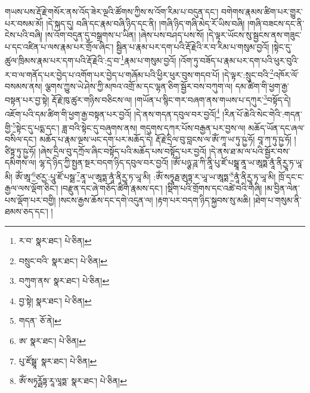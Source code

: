 གཡས་པས་རྡོ་རྗེ་གསོར་ནས་འོད་ཟེར་ལྔའི་ཚོགས་ཀྱིས་ས་འོག་རིམ་པ་བདུན་དང་། བགེགས་རྣམས་ཚིག་པར་གྱུར་པར་བསམ་མོ། །དེ་སྐད་དུ། བཞི་དང་རྣམ་བཞི་ཉིད་དང་ནི། །གཞི་ཉིད་གཞི་མེད་རོ་ཡིས་བཞི། །གཞི་བཟངས་དང་ནི་ངེས་པའི་བཞི། །ས་འོག་བདུན་དུ་བསྒྲགས་པ་ཡིན། །ཞེས་པས་བཤད་པས་སོ། །དེ་ལྟར་ཡོངས་སུ་སྦྱངས་ནས་གཟུང་པ་དང་འཛིན་པ་ལས་རྣམ་པར་གྲོལ་ཞིང་། སྦྱིན་པ་རྣམ་པར་དག་པའི་རྡོ་རྗེའི་ར་བ་རིམ་པ་གསུམ་བྱའོ། །སྟེང་དུ་ཚུལ་ཁྲིམས་རྣམ་པར་དག་པའི་རྡོ་རྗེའི་:དྲ་བ་\footnote{ར་བ་  སྣར་ཐང་།  པེ་ཅིན། }རྣམ་པ་གསུམ་བྱའོ། །འོག་ཏུ་བཟོད་པ་རྣམ་པར་དག་པའི་ཕུར་བུའི་ར་བ་ལ་གནོད་པར་བྱེད་པ་འགོག་པར་བྱེད་པ་གཞོམ་པའི་ཕྱིར་ཕུར་བུས་གདབ་པོ། །དེ་ལྟར་:སྲུང་བའི་\footnote{བསྲུང་བའི་  སྣར་ཐང་།  པེ་ཅིན། }འཁོར་ལོ་བསམས་ནས། ལྕགས་ཀྱུས་ཡེ་ཤེས་ཀྱི་མཁའ་འགྲོ་མ་དང་ལྷན་ཅིག་སྦྱོར་བས་བཀུག་ལ། དམ་ཚིག་གི་ཕྱག་རྒྱ་བསྟན་པར་བྱ་སྟེ། རྡོ་རྗེ་ཁུ་ཚུར་གཉིས་བཅིངས་ལ། །གཡོན་པ་སྙིང་གར་བཞག་ནས་གཡས་པ་དཀུར་\footnote{བཀུག་ནས་  སྣར་ཐང་།  པེ་ཅིན། }བསྟོད་དེ། འཇོག་པའི་དམ་ཚིག་གི་ཕྱག་རྒྱ་བསྟན་པར་བྱའོ། །དེ་ནས་གདན་དབུལ་བར་བྱའོ།\footnote{བྱ་སྟེ།  སྣར་ཐང་།  པེ་ཅིན། } །རིན་པོ་ཆེའི་སེང་གེའི་:གདན་གྱི་\footnote{གདན་  ཅོ་ནེ། }སྟེང་དུ་པདྨ་དང་། ཟླ་བའི་སྟེང་དུ་བཞུགས་ནས། གདུགས་དཀར་པོས་བརྒྱན་པར་བྱས་ལ། མཆོད་ཡོན་དང་ཞལ་བསིལ་དང་། མཆོད་པ་རྣམ་ལྔས་ཡང་དག་པར་མཆོད་དེ། རྡོ་རྗེ་དྲིལ་བུ་བླངས་ལ་ཨོཾ་ཀཱ་ཡ་ཏུ་ཥྱ་ཧོ། བཱ་ཀ་ཏུ་ཥྱ་ཧོ། །ཙིཏྟ་ཏུ་ཥྱ་ཧོ། །ཞེས་དྲིལ་བུ་དཀྲོལ་ཞིང་བསྟོད་པའི་མཆོད་པས་བསྟོད་པར་བྱའོ། །དེ་ནས་ཐ་མ་ལ་པའི་སྦྱོར་བས་དམིགས་ལ། ལྷ་དེ་ཉིད་ཀྱི་སྤྱན་སྔར་བདག་ཉིད་དབུལ་བར་བྱའོ། །ཨོཾ་པཉྩ་ཌཱ་ཀི་ནཱི་པུ་ཛོ་པསྠཱ་ནཱ་ཡ་ཨཱཏྨ་ནཱཾ་ནིརྱཱ་ཏ་ཡཱ་མི། ཨོཾ་ཨཱ་\footnote{ཨ་  སྣར་ཐང་།  པེ་ཅིན། }ཙརྱ་:པཱུ་ཛོ་པསྠ་\footnote{པུ་ཛོསྠཱ་  སྣར་ཐང་།  པེ་ཅིན། }ནཱ་ཡ་ཨཱཏྨ་ནཱཾ་ནིརྱཱ་ཏ་ཡཱ་མི། :ཨོཾ་སཏྭཱརྠ་ཨུཏྟ་ར་ཡཱ་ཡ་ཨཱཏྨ་\footnote{ཨོཾ་སཏྭཪྠོཏྟ་རཱ་ལཱཏྨ་  སྣར་ཐང་།  པེ་ཅིན། }ནཱཾ་ནིརྱཱ་ཏ་ཡཱ་མི། ཁྲོ་དང་ང་རྒྱལ་ལས་ལྡོག་ཅིང་། །བརྫུན་དང་ཞེ་གཅོད་ཚིག་རྣམས་དང་། །སྡིག་པའི་གྲོགས་དང་འཚེ་བའི་གཞི། །མ་བྱིན་ལེན་པས་ལྡོག་པར་བགྱི། །སངས་རྒྱས་ཆོས་དང་དགེ་འདུན་ལ། །རྟག་པར་བདག་ཉིད་སྐྱབས་སུ་མཆི། །ཐེག་པ་གསུམ་ནི་ཐམས་ཅད་དང་། །

